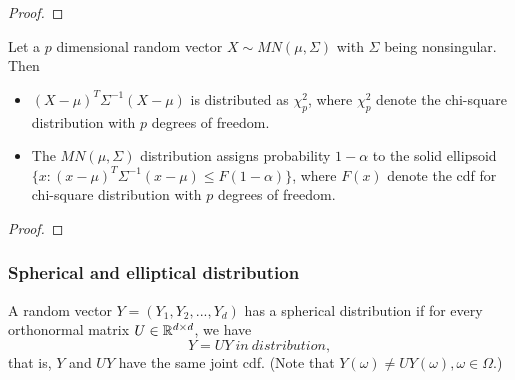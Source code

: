 \begin{refsection}
\begin{proof}
\end{proof}

\begin{lemma}
Let a $p$ dimensional random vector $X\sim MN(\mu,\Sigma)$ with $\Sigma$ being nonsingular. Then
\begin{itemize}
	\item $(X-\mu)^T \Sigma^{-1}(X - \mu)$ is distributed as $\chi_p^2$, where $\chi_p^2$ denote the chi-square distribution with $p$ degrees of freedom.
	\item The $MN(\mu,\Sigma)$ distribution assigns probability $1-\alpha$ to the solid ellipsoid $\{x: (x-\mu)^T\Sigma^{-1}(x-\mu) \leq F(1-\alpha)\}$, where $F(x)$ denote the cdf for chi-square distribution with $p$ degrees of freedom.	
\end{itemize}
\end{lemma}
\begin{proof}
\end{proof}


\subsubsection{Spherical and elliptical distribution}
\begin{definition}\cite[89]{mcneil2015quantitative}
	A random vector $Y=(Y_1,Y_2,...,Y_d)$ has a spherical distribution if for every orthonormal matrix $U\in \mathbb{R}^{d\times d}$, we have
	$$Y = UY ~in~distribution,$$
	that is, $Y$ and $UY$ have the same joint cdf. (Note that $Y(\omega) \neq UY(\omega), \omega \in \Omega$.)	
\end{definition}



\end{refsection}
